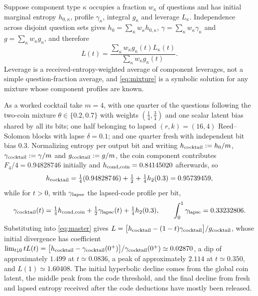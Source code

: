 Suppose component type $\kappa$ occupies a fraction $w_\kappa$ of
questions and has initial marginal entropy $h_{0,\kappa}$, profile
$\gamma_\kappa$, integral $g_\kappa$ and leverage $L_\kappa$.
Independence across disjoint question sets gives
$h_0 = \sum_\kappa w_\kappa h_{0,\kappa}$,
$\gamma = \sum_\kappa w_\kappa\gamma_\kappa$ and
$g = \sum_\kappa w_\kappa g_\kappa$, and therefore
%
\begin{equation}
  L(t)
  = \frac{\sum_\kappa w_\kappa g_\kappa(t)L_\kappa(t)}
         {\sum_\kappa w_\kappa g_\kappa(t)} . 
  \label{eq:mixture}
\end{equation}
%
Leverage is a received-entropy-weighted average of component
leverages, not a simple question-fraction average, and
\eqref{eq:mixture} is a symbolic solution for any mixture whose
component profiles are known.

As a worked cocktail take $m = 4$, with one quarter of the questions
following the two-coin mixture $\theta\in\{0.2,0.7\}$ with weights
$(\tfrac14,\tfrac34)$ and one scalar latent bias shared by all its
bits; one half belonging to lapsed $(r,k) = (16,4)$ Reed--Solomon
blocks with lapse $\delta = 0.1$; and one quarter fresh with
independent bit bias $0.3$. Normalizing entropy per output bit and
writing $h_{\rm cocktail} := h_0/m$,
$\gamma_{\rm cocktail} := \gamma/m$ and
$g_{\rm cocktail} := g/m$, the coin component contributes
$F_4/4 = 0.94828746$ initially and
$h_{\rm cond,coin} = 0.84145020$ afterwards, so
%
\begin{equation}
  h_{\rm cocktail}
  = \tfrac14(0.94828746) + \tfrac12 + \tfrac14 h_2(0.3)
  = 0.95739459,
  \label{eq:cocktailh0}
\end{equation}
%
while for $t > 0$, with $\gamma_{\rm lapse}$ the lapsed-code profile
per bit,
%
\begin{equation}
  \gamma_{\rm cocktail}(t)
  = \tfrac14 h_{\rm cond,coin} + \tfrac12\gamma_{\rm lapse}(t)
  + \tfrac14 h_2(0.3),
  \qquad
  \int_0^1\gamma_{\rm lapse} = 0.33232806 .
  \label{eq:cocktailgamma}
\end{equation}
%
Substituting into \eqref{eq:master} gives
$L = \big[h_{\rm cocktail}-(1-t)\gamma_{\rm cocktail}\big]
/g_{\rm cocktail}$, whose initial divergence has coefficient
$\lim_{t\downarrow0}tL(t)
= \big[h_{\rm cocktail}-\gamma_{\rm cocktail}(0^+)\big]
/\gamma_{\rm cocktail}(0^+)\simeq0.02870$, a dip of approximately
$1.499$ at $t\simeq0.0836$, a peak of approximately $2.114$ at
$t\simeq0.350$, and $L(1)\simeq1.60408$. The initial hyperbolic
decline comes from the global coin latent, the middle peak from the
code threshold, and the final decline from fresh and lapsed entropy
received after the code deductions have mostly been released.


